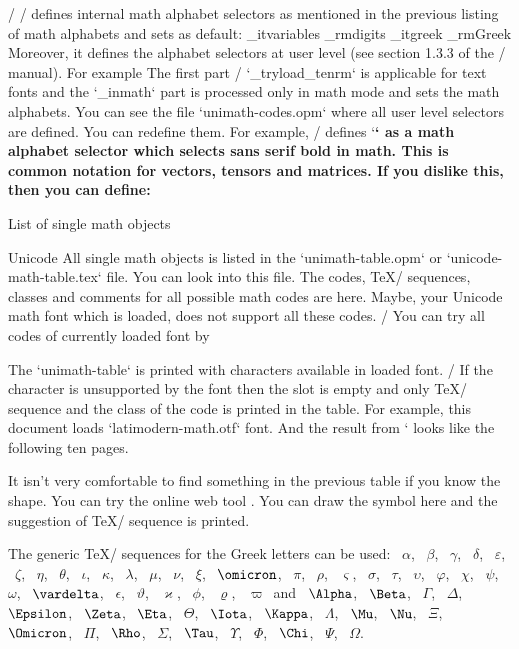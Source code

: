 \new \OpTeX/
\OpTeX/ defines internal math alphabet selectors as mentioned in the
previous listing of math alphabets and sets as default:
\begtt \typosize[10/12]
\_itvariables \_rmdigits \_itgreek \_rmGreek
\endtt
%
Moreover, it defines the alphabet selectors at user level (see section 1.3.3
of the \OpTeX/ manual). For example
\begtt \typosize[10/12]
\def\rm {\_tryload\_tenrm \_inmath{\_rmavariables \_rmdigits}}
\endtt
%
The first part 
\new \OpTeX/
`\_tryload\_tenrm` is applicable for text fonts and the 
`\_inmath` part is processed only in math mode and sets the math alphabets.
You can see the file `unimath-codes.opm` where all user level selectors are
defined. You can redefine them. For example, \OpTeX/ defines `\bf` as a math
alphabet selector which selects sans serif bold in math. This is common
notation for vectors, tensors and matrices. If you dislike this, then you can define:
\begtt \typosize[10/12]
\def\bf {\_tryloadbf\_tenbf \_inmath{\_bfvariables\_bfdigits\_bfgreek\_bfGreek}}
\endtt


\secc[objects] List of single math objects

\new Unicode
All single math objects is listed in the `unimath-table.opm` or
`unicode-math-table.tex` file. You can
look into this file. The codes, \TeX/ sequences, classes and comments
for all possible math codes are here. Maybe, your Unicode math font which is loaded,
does not support all these codes. 
\new \OpTeX/
You can try all codes of currently loaded font by
\begtt

\endtt
The `unimath-table` is printed with characters available in loaded font.
\new \OpTeX/
If the character is unsupported by the font then the slot is empty and only
\TeX/ sequence and the class of the code is printed in the table.
For example, this document loads `latimodern-math.otf` font.
And the result from ` looks like the following ten
pages.

\bigskip

\bigskip

It isn't very comfortable to find something in the previous table
if you know the shape. You can try the online web tool
.
You can draw the symbol here and the suggestion of \TeX/ sequence is
printed.

\def\g#1{{\tt\string#1}~$#1$}

The generic \TeX/ sequences for the Greek letters can be used:
\g\alpha, \g\beta, \g\gamma, \g\delta, \g\varepsilon, \g\zeta, \g\eta,
\g\theta, \g\iota, \g\kappa, \g\lambda, \g\mu, \g\nu, \g\xi,
\g\omicron, \g\pi, \g\rho, \g\varsigma, \g\sigma, \g\tau, \g\upsilon,
\g\varphi, \g\chi, \g\psi, \g\omega, \g\vardelta, \g\epsilon, \g\vartheta,
\g\varkappa, \g\phi, \g\varrho, \g\varpi\
and
\g\Alpha, \g\Beta, \g\Gamma, \g\Delta, \g\Epsilon, \g\Zeta, \g\Eta, \g\Theta,
\g\Iota, \g\Kappa, \g\Lambda, \g\Mu, \g\Nu, \g\Xi, \g\Omicron, \g\Pi, \g\Rho,
\g\Sigma, \g\Tau, \g\Upsilon, \g\Phi, \g\Chi, \g\Psi, \g\Omega.

